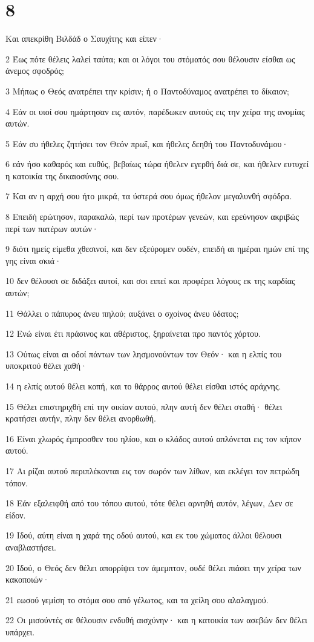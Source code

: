 \chapter{8}

\par Και απεκρίθη Βιλδάδ ο Σαυχίτης και είπεν·
\par 2 Έως πότε θέλεις λαλεί ταύτα; και οι λόγοι του στόματός σου θέλουσιν είσθαι ως άνεμος σφοδρός;
\par 3 Μήπως ο Θεός ανατρέπει την κρίσιν; ή ο Παντοδύναμος ανατρέπει το δίκαιον;
\par 4 Εάν οι υιοί σου ημάρτησαν εις αυτόν, παρέδωκεν αυτούς εις την χείρα της ανομίας αυτών.
\par 5 Εάν συ ήθελες ζητήσει τον Θεόν πρωΐ, και ήθελες δεηθή του Παντοδυνάμου·
\par 6 εάν ήσο καθαρός και ευθύς, βεβαίως τώρα ήθελεν εγερθή διά σε, και ήθελεν ευτυχεί η κατοικία της δικαιοσύνης σου.
\par 7 Και αν η αρχή σου ήτο μικρά, τα ύστερά σου όμως ήθελον μεγαλυνθή σφόδρα.
\par 8 Επειδή ερώτησον, παρακαλώ, περί των προτέρων γενεών, και ερεύνησον ακριβώς περί των πατέρων αυτών·
\par 9 διότι ημείς είμεθα χθεσινοί, και δεν εξεύρομεν ουδέν, επειδή αι ημέραι ημών επί της γης είναι σκιά·
\par 10 δεν θέλουσι σε διδάξει αυτοί, και σοι ειπεί και προφέρει λόγους εκ της καρδίας αυτών;
\par 11 Θάλλει ο πάπυρος άνευ πηλού; αυξάνει ο σχοίνος άνευ ύδατος;
\par 12 Ενώ είναι έτι πράσινος και αθέριστος, ξηραίνεται προ παντός χόρτου.
\par 13 Ούτως είναι αι οδοί πάντων των λησμονούντων τον Θεόν· και η ελπίς του υποκριτού θέλει χαθή·
\par 14 η ελπίς αυτού θέλει κοπή, και το θάρρος αυτού θέλει είσθαι ιστός αράχνης.
\par 15 Θέλει επιστηριχθή επί την οικίαν αυτού, πλην αυτή δεν θέλει σταθή· θέλει κρατήσει αυτήν, πλην δεν θέλει ανορθωθή.
\par 16 Είναι χλωρός έμπροσθεν του ηλίου, και ο κλάδος αυτού απλόνεται εις τον κήπον αυτού.
\par 17 Αι ρίζαι αυτού περιπλέκονται εις τον σωρόν των λίθων, και εκλέγει τον πετρώδη τόπον.
\par 18 Εάν εξαλειφθή από του τόπου αυτού, τότε θέλει αρνηθή αυτόν, λέγων, Δεν σε είδον.
\par 19 Ιδού, αύτη είναι η χαρά της οδού αυτού, και εκ του χώματος άλλοι θέλουσι αναβλαστήσει.
\par 20 Ιδού, ο Θεός δεν θέλει απορρίψει τον άμεμπτον, ουδέ θέλει πιάσει την χείρα των κακοποιών·
\par 21 εωσού γεμίση το στόμα σου από γέλωτος, και τα χείλη σου αλαλαγμού.
\par 22 Οι μισούντές σε θέλουσιν ενδυθή αισχύνην· και η κατοικία των ασεβών δεν θέλει υπάρχει.

